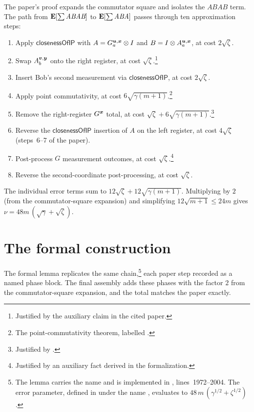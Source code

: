 \documentclass{article}
\newcommand{\ABAB}{\textit{ABAB}}
\newcommand{\ABA}{\textit{ABA}}
\newcommand{\closenessOfIP}{\textsf{closenessOfIP}}
\begin{document}
The paper's proof expands the commutator square and isolates the
$\ABAB$ term. The path from $\E[\sum \ABAB]$ to $\E[\sum \ABA]$
passes through ten approximation steps:
\begin{enumerate}
  \item Apply $\closenessOfIP$ with $A = G^{\boldsymbol{u},{\boldsymbol{x}}}_a \otimes I$ and
    $B = I \otimes A^{\boldsymbol{u},{\boldsymbol{x}}}_a$, at cost $2\sqrt{\zeta}$.
  \item Swap $A^{\boldsymbol{v},\boldsymbol{y}}_b$ onto the right register, at cost
    $\sqrt{\zeta}$.\footnote{Justified by the auxiliary claim
     in the cited paper.}
  \item Insert Bob's second measurement via $\closenessOfIP$, at cost
    $2\sqrt{\zeta}$.
  \item Apply point commutativity, at cost
    $6\sqrt{\gamma(m+1)}$.\footnote{The point-commutativity theorem,
    labelled .}
  \item Remove the right-register $G^{{\boldsymbol{x}}}$ total, at cost
    $\sqrt{\zeta} + 6\sqrt{\gamma(m+1)}$.\footnote{Justified by
    .}
  \item Reverse the $\closenessOfIP$ insertion of $A$ on the left
    register, at cost $4\sqrt{\zeta}$ (steps~6--7 of the paper).
  \item Post-process $G$ measurement outcomes, at cost
    $\sqrt{\zeta}$.\footnote{Justified by an auxiliary fact derived
    in the formalization.}
  \item Reverse the second-coordinate post-processing, at cost
    $\sqrt{\zeta}$.
\end{enumerate}
The individual error terms sum to
$12\sqrt{\zeta} + 12\sqrt{\gamma(m+1)}$. Multiplying by $2$ (from
the commutator-square expansion) and simplifying $12\sqrt{m+1} \leq
24m$ gives $\nu = 48m\,(\sqrt{\gamma}+\sqrt{\zeta})$.

\section{The formal construction}

The formal lemma replicates the same chain,\footnote{The lemma
carries the name  and is implemented in
,
lines~1972--2004. The error parameter, defined in
 under the name
, evaluates to
$48\,m\,(\gamma^{1/2} + \zeta^{1/2})$.}
each paper step recorded as a named phase block. The final assembly
adds these phases with the factor $2$ from the commutator-square
expansion, and the total matches the paper exactly.
\end{document}
